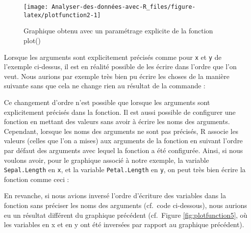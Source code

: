 \documentclass[
  french,
]{book}
\newenvironment{Shaded}{\begin{snugshade}}{\end{snugshade}}
\newcommand{\DataTypeTok}[1]{\textcolor[rgb]{0.13,0.29,0.53}{#1}}
\newcommand{\KeywordTok}[1]{\textcolor[rgb]{0.13,0.29,0.53}{\textbf{#1}}}
\newcommand{\NormalTok}[1]{#1}
\newcommand{\OperatorTok}[1]{\textcolor[rgb]{0.81,0.36,0.00}{\textbf{#1}}}
\begin{document}
\begin{figure}

{\centering \texttt{[image: Analyser-des-données-avec-R\_files/figure-latex/plotfunction2-1]} 

}

\caption{Graphique obtenu avec un paramétrage explicite de la fonction plot()}\label{fig:plotfunction2}
\end{figure}

Lorsque les arguments sont explicitement précisés comme pour \texttt{x} et \texttt{y} de l'exemple ci-dessus, il est en réalité possible de les écrire dans l'ordre que l'on veut. Nous aurions par exemple très bien pu écrire les choses de la manière suivante sans que cela ne change rien au résultat de la commande :

\begin{Shaded}
\end{Shaded}

Ce changement d'ordre n'est possible que lorsque les arguments sont explicitement précisés dans la fonction. Il est aussi possible de configurer une fonction en mettant des valeurs sans avoir à écrire les noms des arguments. Cependant, lorsque les noms des arguments ne sont pas précisés, R associe les valeurs (celles que l'on a mises) aux arguments de la fonction en suivant l'ordre par défaut des arguments avec lequel la fonction a été configurée. Ainsi, si nous voulons avoir, pour le graphique associé à notre exemple, la variable \texttt{Sepal.Length} en \texttt{x}, et la variable \texttt{Petal.Length} en \texttt{y}, on peut très bien écrire la fonction comme ceci :

\begin{Shaded}
\end{Shaded}

En revanche, si nous avions inversé l'ordre d'écriture des variables dans la fonction sans préciser les noms des arguments (cf.~code ci-dessous), nous aurions eu un résultat différent du graphique précédent (cf.~Figure \ref{fig:plotfunction5}, où les variables en x et en y ont été inversées par rapport au graphique précédent).
\end{document}
